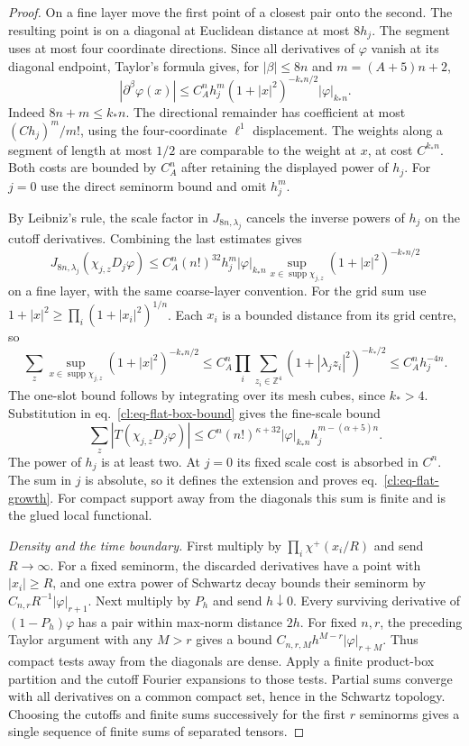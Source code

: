 \documentclass[11pt,letterpaper,reqno]{amsart}
\numberwithin{equation}{section}
\renewcommand{\eqref}[1]{\textup{eq.~\ref{#1}}}
\theoremstyle{definition}
\theoremstyle{remark}
\begin{document}
\begin{proof}
On a fine layer move the first point of a closest pair onto
the second. The resulting point is on a diagonal at Euclidean
distance at most \(8h_j\). The segment uses at most four
coordinate directions. Since all derivatives of \(\varphi\)
vanish at its diagonal endpoint, Taylor's formula gives, for
\(|\beta|\le8n\) and \(m=(A+5)n+2\),
\[
 |\partial^\beta\varphi(x)|\le
 C_A^n h_j^m (1+|x|^2)^{-k_*n/2}|\varphi|_{k_*n}.
\]
Indeed \(8n+m\le k_*n\). The directional remainder has
coefficient at most \((Ch_j)^m/m!\), using the four-coordinate
\(\ell^1\) displacement. The weights along a segment of length
at most \(1/2\) are comparable to the weight at \(x\), at cost
\(C^{k_*n}\). Both costs are bounded by \(C_A^n\) after
retaining the displayed power of \(h_j\).
For \(j=0\) use the direct seminorm bound and omit \(h_j^m\).

By Leibniz's rule, the scale factor in \(J_{8n,\lambda_j}\)
cancels the inverse powers of \(h_j\) on the cutoff derivatives.
Combining the last estimates gives
\[
 J_{8n,\lambda_j}(\chi_{j,z}D_j\varphi)
 \le C_A^n(n!)^{32}h_j^m|\varphi|_{k_*n}
     \sup_{x\in\operatorname{supp}\chi_{j,z}}
                 (1+|x|^2)^{-k_*n/2}
\]
on a fine layer, with the same coarse-layer convention.
For the grid sum use
\(1+|x|^2\ge\prod_i(1+|x_i|^2)^{1/n}\).
Each \(x_i\) is a bounded distance from its grid centre, so
\[
 \sum_z\sup_{x\in\operatorname{supp}\chi_{j,z}}
                 (1+|x|^2)^{-k_*n/2}
 \le C_A^n \prod_i\sum_{z_i\in\mathbb Z^4}
               (1+|\lambda_j z_i|^2)^{-k_*/2}
 \le C_A^n h_j^{-4n}.
\]
The one-slot bound follows by integrating over its mesh cubes,
since \(k_*>4\). Substitution in \eqref{cl:eq-flat-box-bound}
gives the fine-scale bound
\[
 \sum_z |T(\chi_{j,z}D_j\varphi)|
 \le C^n(n!)^{\kappa+32}|\varphi|_{k_*n}
                  h_j^{m-(\alpha+5)n}.
\]
The power of \(h_j\) is at least two. At \(j=0\) its fixed scale
cost is absorbed in \(C^n\). The sum in \(j\) is absolute,
so it defines the extension and proves \eqref{cl:eq-flat-growth}.
For compact support away from the diagonals this sum is finite
and is the glued local functional.

\emph{Density and the time boundary.}
First multiply by \(\prod_i\chi^+(x_i/R)\) and send \(R\to\infty\).
For a fixed seminorm, the discarded derivatives have a point
with \(|x_i|\ge R\), and one extra power of Schwartz decay
bounds their seminorm by \(C_{n,r}R^{-1}|\varphi|_{r+1}\).
Next multiply by \(P_h\) and send \(h\downarrow0\).
Every surviving derivative of \((1-P_h)\varphi\) has a pair
within max-norm distance \(2h\). For fixed \(n,r\), the preceding
Taylor argument with any \(M>r\) gives a bound
\(C_{n,r,M}h^{M-r}|\varphi|_{r+M}\).
Thus compact tests away from the diagonals are dense.
Apply a finite product-box partition and the cutoff Fourier
expansions to those tests. Partial sums converge with all
derivatives on a common compact set, hence in the Schwartz
topology. Choosing the cutoffs and finite sums successively
for the first \(r\) seminorms gives a single sequence of finite
sums of separated tensors.


\end{proof}
\end{document}
